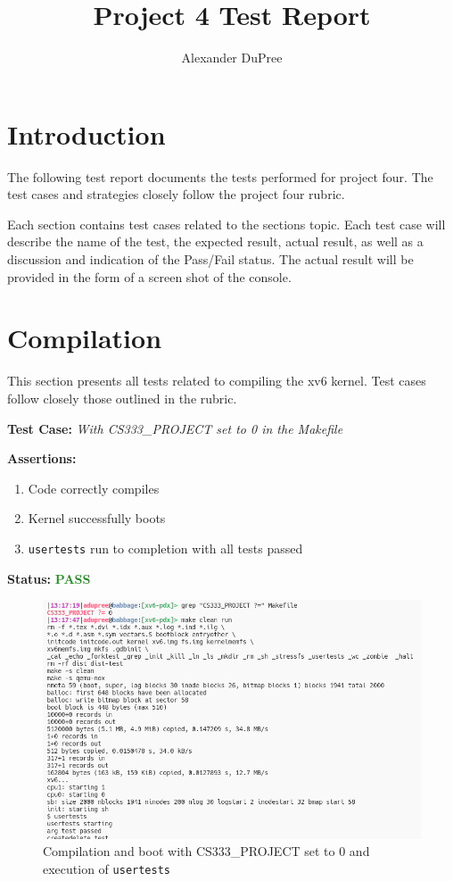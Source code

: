 \documentclass[11pt,letterpaper]{report}
\newcommand{\code}[1]{\colorbox{codegray}{\texttt{#1}}}
\begin{document}
\title{Project 4 Test Report}
\author{Alexander DuPree}

\ifdefined \LF
{\Large     %
\fi

  \maketitle
  \section*{Introduction}
  \noindent
  The following test report documents the tests performed for project four. The test cases and strategies closely follow the project four rubric. 

  Each section contains test cases related to the sections topic. Each test case will describe the name of the test, 
  the expected result, actual result, as well as a discussion and indication of the Pass/Fail status. 
  The actual result will be provided in the form of a screen shot of the console. 

  \section*{Compilation}
  This section presents all tests related to compiling the xv6 kernel.
  Test cases follow closely those outlined in the rubric. \hfill \break
  
  \noindent\textbf{Test Case:} \emph{With CS333\_PROJECT set to 0 in the Makefile}
  
  \noindent\textbf{Assertions:}
  \begin{enumerate}[]
  \item Code correctly compiles
  \item Kernel successfully boots
  \item \code{usertests} run to completion with all tests passed
  \end{enumerate}  
  
  \noindent\textbf{Status:} \textcolor{ForestGreen}{\textbf{PASS}}
  
  \begin{figure}[h!]
	\centering
	\includegraphics[width=1\linewidth]{compilation1-usertests1.png}
	\caption[img]{Compilation and boot with CS333\_PROJECT set to 0 and execution of \code{usertests}}
	\label{fig:P1compileP0-1}
  \end{figure}

}
\end{document}
